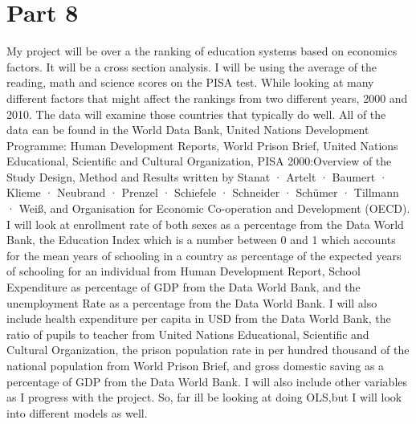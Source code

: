\documentclass{article}
\begin{document}
\section{Part 8}
My project will be over a the ranking of education systems based on economics factors. It will be a cross section analysis. I will be using the average of the reading, math and science scores on the PISA test. While looking at many different factors that might affect the rankings from two different years, 2000 and 2010. The data will examine those countries that typically do well. All of the data can be found in the World Data Bank, United Nations Development Programme: Human Development Reports, World Prison Brief, United Nations Educational, Scientific and Cultural Organization, PISA 2000:Overview of the Study Design, Method and Results written by Stanat · Artelt · Baumert · Klieme · Neubrand · Prenzel · Schiefele · Schneider · Schümer · Tillmann · Weiß, and Organisation for Economic Co-operation and Development (OECD). 
I will look at enrollment rate of both sexes as a percentage from the Data World Bank, the Education Index which is a number between 0 and 1 which accounts for the mean years of schooling in a country as percentage of the expected years of schooling for an individual from Human Development Report, School Expenditure as percentage of GDP from the Data World Bank, and the unemployment Rate as a percentage from the Data World Bank. I will also include health expenditure per capita in USD from the Data World Bank, the ratio of pupils to teacher from United Nations Educational, Scientific and Cultural Organization, the prison population rate in per hundred thousand of the national population from World Prison Brief, and gross domestic saving as a percentage of GDP from the Data World Bank. I will also include other variables as I progress with the project. So, far ill be looking at doing OLS,but I will look into different models as well.
\end{document}

